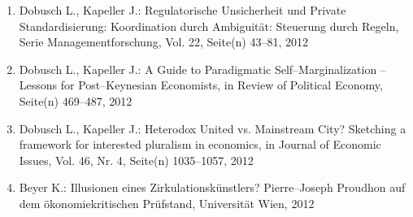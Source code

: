 \begin{enumerate}
	 \item Dobusch L., Kapeller J.: Regulatorische Unsicherheit und Private Standardisierung: Koordination durch Ambiguität: Steuerung durch Regeln, Serie Managementforschung, Vol. 22, Seite(n) 43--81, 2012
	 \item Dobusch L., Kapeller J.: A Guide to Paradigmatic Self--Marginalization -- Lessons for Post--Keynesian Economists, in Review of Political Economy, Seite(n) 469--487, 2012
	 \item Dobusch L., Kapeller J.: Heterodox United vs. Mainstream City? Sketching a framework for interested pluralism in economics, in Journal of Economic Issues, Vol. 46, Nr. 4, Seite(n) 1035--1057, 2012
	 \item Beyer K.: Illusionen eines Zirkulationskünstlers? Pierre--Joseph Proudhon auf dem ökonomiekritischen Prüfstand, Universität Wien, 2012
\end{enumerate}
